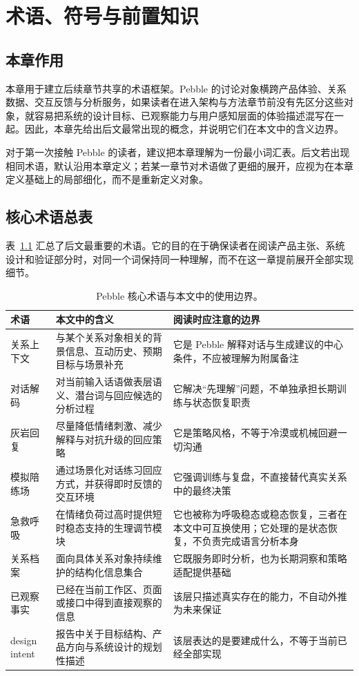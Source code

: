 \chapter{术语、符号与前置知识}

\section{本章作用}

本章用于建立后续章节共享的术语框架。Pebble 的讨论对象横跨产品体验、关系数据、交互反馈与分析服务，如果读者在进入架构与方法章节前没有先区分这些对象，就容易把系统的设计目标、已观察能力与用户感知层面的体验描述混写在一起。因此，本章先给出后文最常出现的概念，并说明它们在本文中的含义边界。

对于第一次接触 Pebble 的读者，建议把本章理解为一份最小词汇表。后文若出现相同术语，默认沿用本章定义；若某一章节对术语做了更细的展开，应视为在本章定义基础上的局部细化，而不是重新定义对象。

\section{核心术语总表}

表~\ref{tab:pebble-terms} 汇总了后文最重要的术语。它的目的在于确保读者在阅读产品主张、系统设计和验证部分时，对同一个词保持同一种理解，而不在这一章提前展开全部实现细节。

\begin{table}[H]
  \centering
  \caption{Pebble 核心术语与本文中的使用边界。}
  \label{tab:pebble-terms}
  \begin{tabularx}{\textwidth}{>{\raggedright\arraybackslash}p{2.8cm} >{\raggedright\arraybackslash}X >{\raggedright\arraybackslash}X}
    \toprule
    术语 & 本文中的含义 & 阅读时应注意的边界 \\
    \midrule
    关系上下文 & 与某个关系对象相关的背景信息、互动历史、预期目标与场景补充 & 它是 Pebble 解释对话与生成建议的中心条件，不应被理解为附属备注 \\
    对话解码 & 对当前输入话语做表层语义、潜台词与回应候选的分析过程 & 它解决“先理解”问题，不单独承担长期训练与状态恢复职责 \\
    灰岩回复 & 尽量降低情绪刺激、减少解释与对抗升级的回应策略 & 它是策略风格，不等于冷漠或机械回避一切沟通 \\
    模拟陪练场 & 通过场景化对话练习回应方式，并获得即时反馈的交互环境 & 它强调训练与复盘，不直接替代真实关系中的最终决策 \\
    急救呼吸 & 在情绪负荷过高时提供短时稳态支持的生理调节模块 & 它也被称为呼吸稳态或稳态恢复，三者在本文中可互换使用；它处理的是状态恢复，不负责完成语言分析本身 \\
    关系档案 & 面向具体关系对象持续维护的结构化信息集合 & 它既服务即时分析，也为长期洞察和策略适配提供基础 \\
    已观察事实 & 已经在当前工作区、页面或接口中得到直接观察的信息 & 该层只描述真实存在的能力，不自动外推为未来保证 \\
    design intent & 报告中关于目标结构、产品方向与系统设计的规划性描述 & 该层表达的是要建成什么，不等于当前已经全部实现 \\
    \bottomrule
  \end{tabularx}
\end{table}

